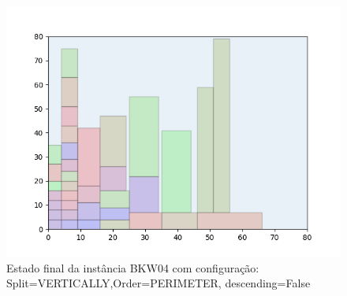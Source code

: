 \begin{figure}[H]
    \centering
    \caption[]{Estado final da instância BKW04 com configuração: Split=VERTICALLY,Order=PERIMETER, descending=False}
    \label{fig:bkw04-vertically-perimeter-false}
    \includegraphics[scale=0.5]{output/figures/bkw/bkw04/vertically/perimeter/false/00}
\end{figure}